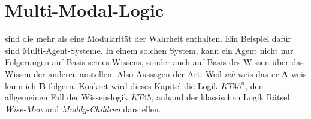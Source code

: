 

\section{Multi-Modal-Logic} %
\label{sec:multi_modal_logic}
\MML sind \NML die mehr als eine Modularität der Wahrheit enthalten.
Ein Beispiel dafür sind Multi-Agent-Systeme. 
In einem solchen System, kann ein Agent nicht nur Folgerungen auf Basis seines Wissens, sonder auch auf Basis des Wissen über das Wissen der anderen anstellen. Also Aussagen der Art: Weil \emph{ich} weis das \emph{er} \textbf{A} weis kann ich \textbf{B} folgern.
Konkret wird dieses Kapitel die Logik $KT45^n$, den allgemeinen Fall der Wissenslogik $KT45$, anhand der klassischen Logik Rätsel \emph{Wise-Men} und \emph{Muddy-Children} darstellen.





